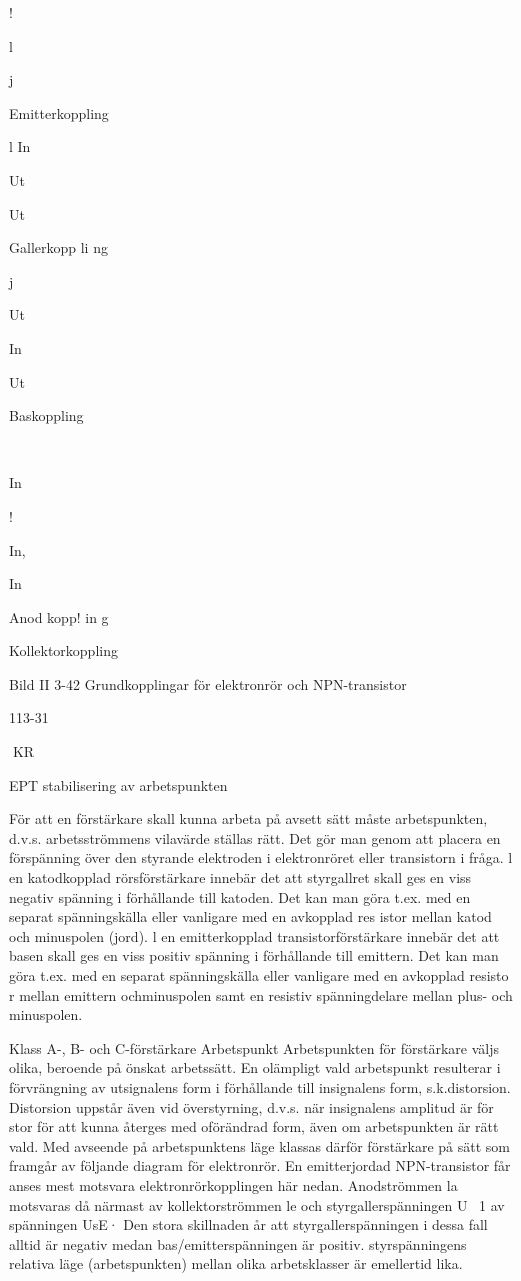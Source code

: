{{{!

l

j

Emitterkoppling

l
In

Ut

Ut

Gallerkopp li ng

j

Ut

In

Ut

Baskoppling

~

In

!

In,

In

Anod kopp! in g

Kollektorkoppling

Bild II 3-42 Grundkopplingar för elektronrör och NPN-transistor

113-31

KR

EPT
stabilisering av arbetspunkten

För att en förstärkare skall kunna arbeta på
avsett sätt måste arbetspunkten, d.v.s.
arbetsströmmens vilavärde ställas rätt.
Det gör man genom att placera en förspänning över den styrande elektroden i
elektronröret eller transistorn i fråga.
l en katodkopplad rörsförstärkare innebär det att styrgallret skall ges en viss negativ spänning i förhållande till katoden. Det
kan man göra t.ex. med en separat spänningskälla eller vanligare med en avkopplad
res istor mellan katod och minuspolen (jord).
l en emitterkopplad transistorförstärkare
innebär det att basen skall ges en viss positiv
spänning i förhållande till emittern. Det kan
man göra t.ex. med en separat spänningskälla eller vanligare med en avkopplad resisto r mellan emittern ochminuspolen samt en
resistiv spänningdelare mellan plus- och
minuspolen.

Klass A-, B- och C-förstärkare
Arbetspunkt
Arbetspunkten för förstärkare väljs olika,
beroende på önskat arbetssätt. En olämpligt
vald arbetspunkt resulterar i förvrängning av
utsignalens form i förhållande till insignalens
form, s.k.distorsion. Distorsion uppstår även
vid överstyrning, d.v.s. när insignalens amplitud är för stor för att kunna återges med
oförändrad form, även om arbetspunkten är
rätt vald.
Med avseende på arbetspunktens läge
klassas därför förstärkare på sätt som framgår av följande diagram för elektronrör. En
emitterjordad NPN-transistor får anses mest
motsvara elektronrörkopplingen här nedan.
Anodströmmen la motsvaras då närmast av
kollektorströmmen le och styrgallerspänningen U~ 1 av spänningen UsE· Den stora skillnaden år att styrgallerspänningen i dessa fall
alltid är negativ medan bas/emitterspänningen är positiv. styrspänningens relativa läge
(arbetspunkten) mellan olika arbetsklasser
är emellertid lika.

}}}
